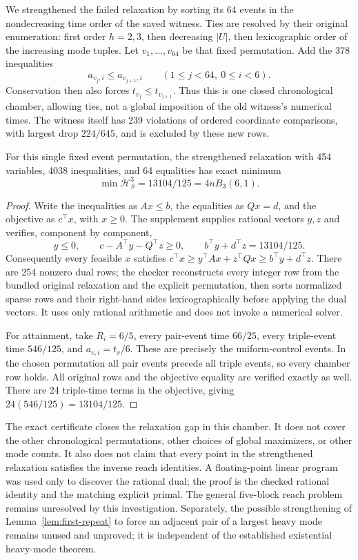 We strengthened the failed relaxation by sorting its 64 events in the
nondecreasing time order of the saved witness. Ties are resolved by their
original enumeration: first order $h=2,3$, then decreasing $|U|$, then
lexicographic order of the increasing mode tuples. Let $v_1,\ldots,v_{64}$
be that fixed permutation. Add the 378 inequalities
\begin{equation}\label{eq:chamber-cuts}
 a_{v_j,i}\le a_{v_{j+1},i}\qquad(1\le j<64,\ 0\le i<6).
\end{equation}
Conservation then also forces $t_{v_j}\le t_{v_{j+1}}$.
Thus this is one closed chronological chamber, allowing ties, not a
global imposition of the old witness's numerical times. The witness itself
has 239 violations of ordered coordinate comparisons, with largest drop
$224/645$, and is excluded by these new rows.

\begin{proposition}
\label{prop:chronological-chamber}
For this single fixed event permutation, the strengthened relaxation with
454 variables, 4038 inequalities, and 64 equalities has exact minimum
\[
 \min\mathcal H_S^3=13104/125=4nB_3(6,1).
\]
\end{proposition}
\begin{proof}
Write the inequalities as $Ax\le b$, the equalities as $Qx=d$, and
the objective as $c^\top x$, with $x\ge0$. The supplement supplies
rational vectors $y,z$ and verifies, component by component,
\[
 y\le0,\qquad c-A^\top y-Q^\top z\ge0,\qquad
 b^\top y+d^\top z=13104/125.
\]
Consequently every feasible $x$ satisfies
$c^\top x\ge y^\top Ax+z^\top Qx\ge b^\top y+d^\top z$.
There are 254 nonzero dual rows; the checker reconstructs every integer
row from the bundled original relaxation and the explicit permutation,
then sorts normalized sparse rows and their right-hand sides
lexicographically before applying the dual vectors.
It uses only rational arithmetic and does not invoke a numerical solver.

For attainment, take $R_i=6/5$, every pair-event time $66/25$, every
triple-event time $546/125$, and $a_{v,i}=t_v/6$. These are precisely the
uniform-control events. In the chosen permutation all pair events precede
all triple events, so every chamber row holds. All original rows and the
objective equality are verified exactly as well. There are 24 triple-time
terms in the objective, giving $24(546/125)=13104/125$.
\end{proof}

The exact certificate closes the relaxation gap in this chamber. It does
not cover the other chronological permutations, other choices of global
maximizers, or other mode counts. It also does not claim that every point
in the strengthened relaxation satisfies the inverse reach identities.
A floating-point linear program was used only to discover the rational
dual; the proof is the checked rational identity and the matching explicit
primal. The general five-block reach problem remains unresolved by this
investigation. Separately, the possible strengthening of
Lemma~\ref{lem:first-repeat} to force an adjacent pair of a largest heavy
mode remains unused and unproved; it is independent of the established
existential heavy-mode theorem.
